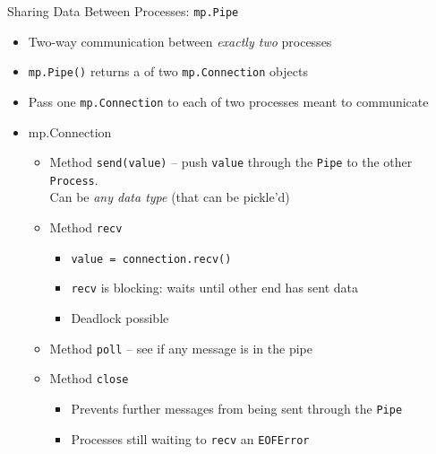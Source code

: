 
\begin{frame}{Sharing Data Between Processes: \texttt{mp.Pipe}}
%
\begin{itemize}
\item Two-way communication between \emph{exactly two} processes
\item \texttt{mp.Pipe()} returns a  of two \texttt{mp.Connection} objects
\item Pass one \texttt{mp.Connection} to each of two processes meant to communicate
\item {mp.Connection} 
	\begin{itemize}
	\item Method \texttt{send(value)} -- push \texttt{value} through the \texttt{Pipe} to the other \texttt{Process}.\\
		Can be \emph{any data type} (that can be pickle'd)
	\item Method \texttt{recv}
		\begin{itemize}
		\item \texttt{value = connection.recv()}
		\item \texttt{recv} is blocking: waits until other end has sent data
		\item Deadlock possible
		\end{itemize}
	\item Method \texttt{poll}  -- see if any message is in the pipe
	\item Method \texttt{close}
		\begin{itemize}
		\item Prevents further messages from being sent through the \texttt{Pipe}
		\item Processes still waiting to \texttt{recv}  an \texttt{EOFError}
		\end{itemize}
	\end{itemize}
\end{itemize}
%
\end{frame}


